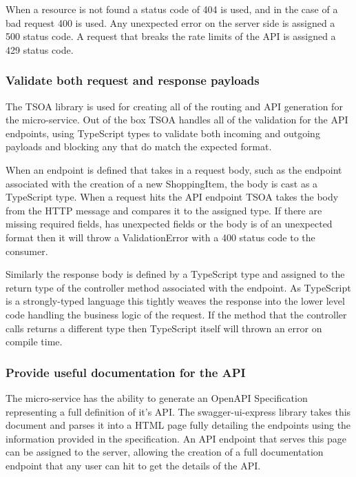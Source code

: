When a resource is not found a status code of 404 is used, and in the case of a bad request 400 is used. Any unexpected error on the server side is assigned a 500 status code. A request that breaks the rate limits of the API is assigned a 429 status code.
\subsubsection{Validate both request and response payloads}
The TSOA library is used for creating all of the routing and API generation for the micro-service. Out of the box TSOA handles all of the validation for the API endpoints, using TypeScript types to validate both incoming and outgoing payloads and blocking any that do match the expected format.

When an endpoint is defined that takes in a request body, such as the endpoint associated with the creation of a new ShoppingItem, the body is cast as a TypeScript type. When a request hits the API endpoint TSOA takes the body from the HTTP message and compares it to the assigned type. If there are missing required fields, has unexpected fields or the body is of an unexpected format then it will throw a ValidationError with a 400 status code to the consumer.

Similarly the response body is defined by a TypeScript type and assigned to the return type of the controller method associated with the endpoint. As TypeScript is a strongly-typed language this tightly weaves the response into the lower level code handling the business logic of the request. If the method that the controller calls returns a different type then TypeScript itself will thrown an error on compile time.
\subsubsection{Provide useful documentation for the API}
The micro-service has the ability to generate an OpenAPI Specification representing a full definition of it's API. The swagger-ui-express library takes this document and parses it into a HTML page fully detailing the endpoints using the information provided in the specification. An API endpoint that serves this page can be assigned to the server, allowing the creation of a full documentation endpoint that any user can hit to get the details of the API.

